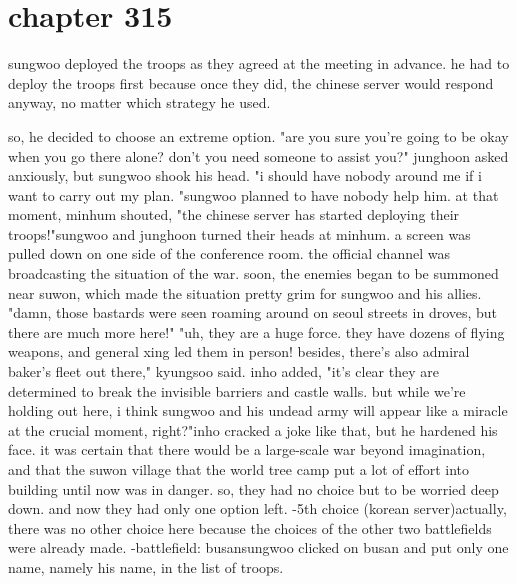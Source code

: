 \section{chapter 315}

sungwoo deployed the troops as they agreed at the meeting in advance.
 he had to deploy the troops first because once they did, the chinese server would respond anyway, no matter which strategy he used.





so, he decided to choose an extreme option.
 "are you sure you're going to be okay when you go there alone? don't you need someone to assist you?" junghoon asked anxiously, but sungwoo shook his head.
"i should have nobody around me if i want to carry out my plan.
"sungwoo planned to have nobody help him.
 at that moment, minhum shouted, "the chinese server has started deploying their troops!"sungwoo and junghoon turned their heads at minhum.
a screen was pulled down on one side of the conference room.
 the official channel was broadcasting the situation of the war.
soon, the enemies began to be summoned near suwon, which made the situation pretty grim for sungwoo and his allies.
"damn, those bastards were seen roaming around on seoul streets in droves, but there are much more here!" "uh, they are a huge force.
 they have dozens of flying weapons, and general xing led them in person! besides, there's also admiral baker's fleet out there," kyungsoo said.
inho added, "it's clear they are determined to break the invisible barriers and castle walls.
 but while we're holding out here, i think sungwoo and his undead army will appear like a miracle at the crucial moment, right?"inho cracked a joke like that, but he hardened his face.
it was certain that there would be a large-scale war beyond imagination, and that the suwon village that the world tree camp put a lot of effort into building until now was in danger.
 so, they had no choice but to be worried deep down.
and now they had only one option left.
-5th choice (korean server)actually, there was no other choice here because the choices of the other two battlefields were already made.
 -battlefield: busansungwoo clicked on busan and put only one name, namely his name, in the list of troops.
 
